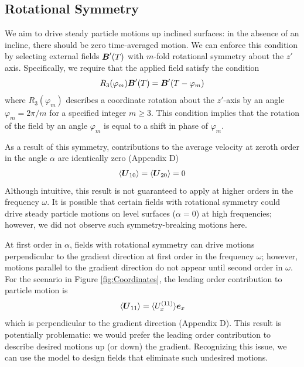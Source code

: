 \subsection{Rotational Symmetry}

We aim to drive steady particle motions up inclined surfaces: in the absence of an incline, there should be zero time-averaged motion.  We can enforce this condition by selecting external fields $\boldsymbol{B}'(T)$ with $m$-fold rotational symmetry about the $z'$ axis.  Specifically, we require that the applied field satisfy the condition
\begin{equation}
    R_3(\varphi_m) \boldsymbol{B}'(T) = \boldsymbol{B}'(T-\varphi_m) \label{eq:rotation}
\end{equation}
where $R_3(\varphi_m)$ describes a coordinate rotation about the $z'$-axis by an angle $\varphi_m=2\pi/m$ for a specified integer $m\geq3$. This condition implies that the rotation of the field by an angle $\varphi_m$ is equal to a shift in phase of $\varphi_m$.  

As a result of this symmetry, contributions to the average velocity at zeroth order in the angle $\alpha$ are identically zero (Appendix D)
\begin{equation}
    \langle\boldsymbol{U}_{10}\rangle = \langle\boldsymbol{U}_{20}\rangle = 0 \label{eq:alpha0}
\end{equation}
Although intuitive, this result is not guaranteed to apply at higher orders in the frequency $\omega$. It is possible that certain fields with rotational symmetry could drive steady particle motions on level surfaces ($\alpha=0$) at high frequencies; however, we did not observe such symmetry-breaking motions here.

At first order in $\alpha$, fields with rotational symmetry can drive motions perpendicular to the gradient direction at first order in the frequency $\omega$; however, motions parallel to the gradient direction do not appear until second order in $\omega$. For the scenario in Figure \ref{fig:Coordinates}, the leading order contribution to particle motion is
\begin{equation}
    \langle \boldsymbol{U}_{11}\rangle = \langle U_x^{(11)}\rangle \boldsymbol{e}_{x}  \label{eq:alpha1}
\end{equation}
which is perpendicular to the gradient direction (Appendix D). This result is potentially problematic: we would prefer the leading order contribution to describe desired motions up (or down) the gradient.  Recognizing this issue, we can use the model to design fields that eliminate such undesired motions.

